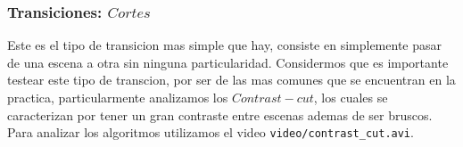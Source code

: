 \subsubsection{Transiciones: $Cortes$}

Este es el tipo de transicion mas simple que hay, consiste en simplemente pasar de una escena a otra sin ninguna particularidad. Considermos que es importante testear este tipo de transcion, por ser de las mas comunes que se encuentran en la practica, particularmente analizamos los $Contrast-cut$, los cuales se caracterizan por tener un gran contraste entre escenas ademas de ser bruscos. Para analizar los algoritmos utilizamos el video \texttt{video/contrast_cut.avi}.
